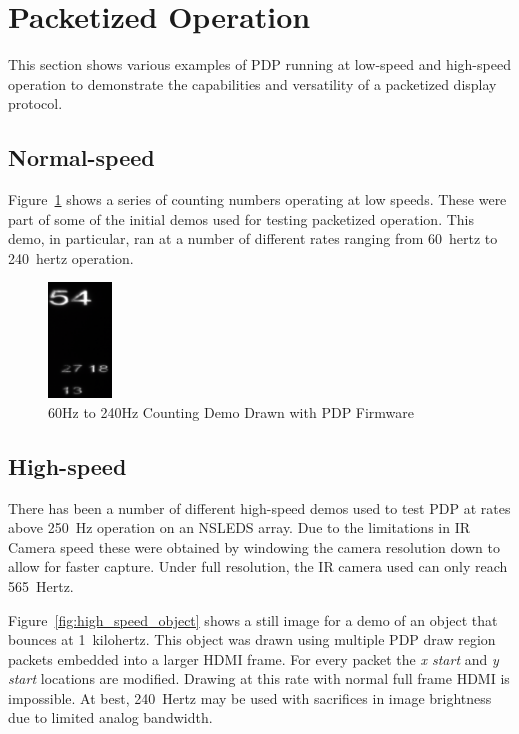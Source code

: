 \section{Packetized Operation}
        This section shows various examples of PDP running at low-speed and high-speed operation to demonstrate the capabilities and versatility of a packetized display protocol.

    \subsection{Normal-speed}
        Figure~\ref{fig:low_speed_numbers} shows a series of counting numbers operating at low speeds. These were part of some of the initial demos used for testing packetized operation. This demo, in particular, ran at a number of different rates ranging from \mbox{60 hertz} to \mbox{240 hertz} operation.

        \begin{figure}
            \centering
            \includegraphics[width=0.15\textwidth]{fig/low_speed_numbers.png}
            \caption{60Hz to 240Hz Counting Demo Drawn with PDP Firmware}
            \label{fig:low_speed_numbers}
        \end{figure}

    \subsection{High-speed}
        There has been a number of different high-speed demos used to test PDP at rates above \mbox{250 Hz} operation on an NSLEDS array. Due to the limitations in IR Camera speed these were obtained by windowing the camera resolution down to allow for faster capture. Under full resolution, the IR camera used can only reach \mbox{565 Hertz}.

        Figure~\ref{fig:high_speed_object} shows a still image for a demo of an object that bounces at \mbox{1 kilohertz}. This object was drawn using multiple PDP draw region packets embedded into a larger HDMI frame. For every packet the {\it x start} and {\it y start} locations are modified. Drawing at this rate with normal full frame HDMI is impossible. At best, \mbox{240 Hertz} may be used with sacrifices in image brightness due to limited analog bandwidth.

